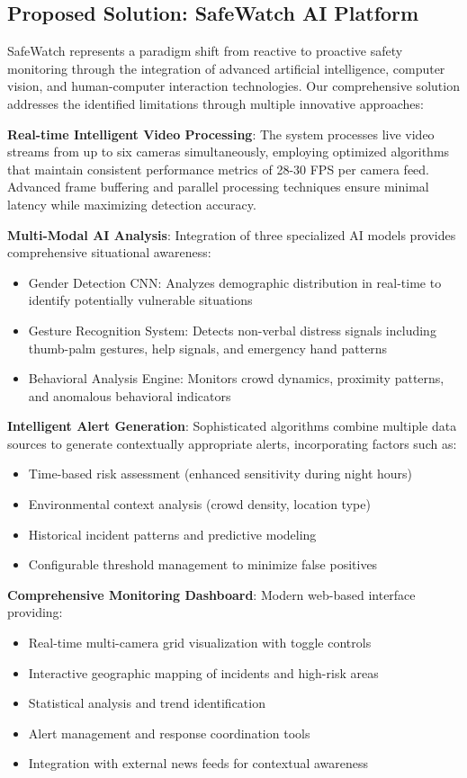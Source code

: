 \documentclass[12pt,a4paper]{article}
\begin{document}
\subsection{Proposed Solution: SafeWatch AI Platform}

SafeWatch represents a paradigm shift from reactive to proactive safety monitoring through the integration of advanced artificial intelligence, computer vision, and human-computer interaction technologies. Our comprehensive solution addresses the identified limitations through multiple innovative approaches:

\textbf{Real-time Intelligent Video Processing}: The system processes live video streams from up to six cameras simultaneously, employing optimized algorithms that maintain consistent performance metrics of 28-30 FPS per camera feed. Advanced frame buffering and parallel processing techniques ensure minimal latency while maximizing detection accuracy.

\textbf{Multi-Modal AI Analysis}: Integration of three specialized AI models provides comprehensive situational awareness:
\begin{itemize}
    \item Gender Detection CNN: Analyzes demographic distribution in real-time to identify potentially vulnerable situations
    \item Gesture Recognition System: Detects non-verbal distress signals including thumb-palm gestures, help signals, and emergency hand patterns
    \item Behavioral Analysis Engine: Monitors crowd dynamics, proximity patterns, and anomalous behavioral indicators
\end{itemize}

\textbf{Intelligent Alert Generation}: Sophisticated algorithms combine multiple data sources to generate contextually appropriate alerts, incorporating factors such as:
\begin{itemize}
    \item Time-based risk assessment (enhanced sensitivity during night hours)
    \item Environmental context analysis (crowd density, location type)
    \item Historical incident patterns and predictive modeling
    \item Configurable threshold management to minimize false positives
\end{itemize}

\textbf{Comprehensive Monitoring Dashboard}: Modern web-based interface providing:
\begin{itemize}
    \item Real-time multi-camera grid visualization with toggle controls
    \item Interactive geographic mapping of incidents and high-risk areas
    \item Statistical analysis and trend identification
    \item Alert management and response coordination tools
    \item Integration with external news feeds for contextual awareness
\end{itemize}
\end{document}
